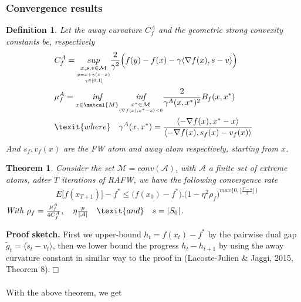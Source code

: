\documentclass{article}
\newtheorem{theorem}{Theorem}
\newtheorem{definition}{Definition}
\begin{document}
\subsubsection{Convergence results}
\begin{definition} \cite{Kerdeuxetal18}
Let the \textit{away curvature} $C^{A}_{f}$ and the \textit{geometric strong convexity} constants be, respectively
\begin{equation*}
\begin{aligned}
    &C^{A}_{f}= \underset{\underset{\underset{\gamma\in[0,1]}{y=x+\gamma(s- x)}}{x,s,v\in\mathcal{M}}}{sup}\frac{2}{\gamma^{2}}\Big(f(y)- f(x)- \gamma\langle \nabla f(x), s- v\rangle\Big)\\
    &\mu^{A}_{f}= \underset{x\in\matcal{M}}{\textit{inf}}\underset{\underset{\langle\nabla f(x), x^{*}-x\rangle < 0}{x^{*}\in\mathcal{M}}}{\textit{inf}}\frac{2}{\gamma^{A}(x,x^{*})^{2}}B_{f}(x,x^{*})\\
    &\texit{where}\quad\gamma^{A}(x,x^{*})=\frac{\langle -\nabla f(x), x^{*}- x\rangle}{\langle -\nabla f(x), s_{f}(x)- v_{f}(x)\rangle}\\
\end{aligned}
\end{equation*}
And $s_{f}, v_{f}(x)$ are the FW atom and away atom respectively, starting from $x$.
\end{definition} 
\begin{theorem} \cite{Kerdeuxetal18}
Consider the set $\mathcal{M}=conv(\mathcal{A})$, with $\mathcal{A}$ a finite set of extreme atoms, adter $T$ iterations of RAFW, we have the following convergence rate
\begin{equation*}
\begin{aligned}
    &E\big[f(x_{T+1})\big]- f^{*}\leq \Big(f(x_{0})- f^{*}\Big).\Big(1- \eta^{2}\rho_{f}\Big)^{\textit{max}\{0,\lfloor\frac{T-s}{2}\rfloor\}}
\end{aligned}
\end{equation*}
With $\rho_{f}= \frac{\mu^{A}_{f}}{4C^{A}_{f}},\quad\eta\frac{p}{|\mathcal{A}|}\quad\texit{and}\quad s=|S_{0}|$.
\end{theorem}
\textbf{Proof sketch.} First we upper-bound $h_{t}=f(x_{t})- f^{*}$ by the pairwise dual gap $\tilde{g}_{t}=\langle \tilde{s}_{t}- v_{t}\rangle$, then we lower bound the progress $h_{t}- h_{t+1}$ by using the away curvature constant in similar way to the proof in (Lacoste-Julien & Jaggi, 2015, Theorem 8).$\Box$\\
\\
With the above theorem, we get 
\end{document}
